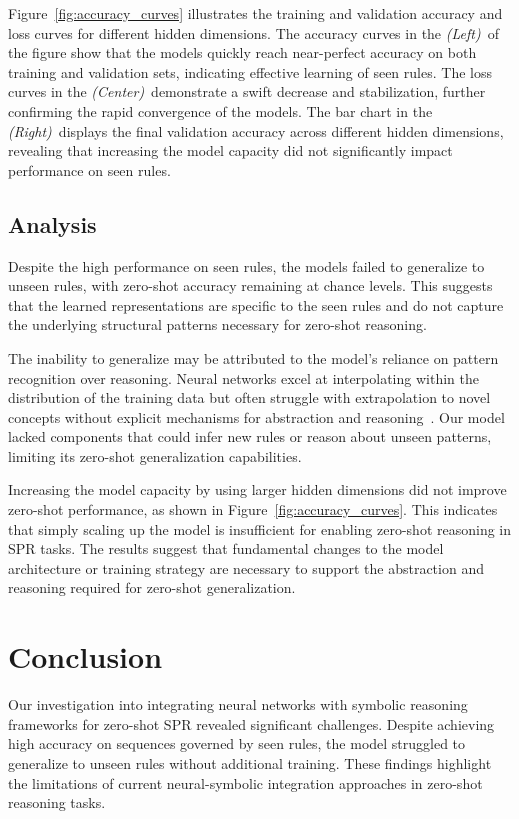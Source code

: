 \documentclass{article} %
\newcommand{\figleft}{{\em (Left)\/}}
\newcommand{\figcenter}{{\em (Center)\/}}
\newcommand{\figright}{{\em (Right)\/}}
\theoremstyle{plain}
\begin{document}
Figure~\ref{fig:accuracy_curves} illustrates the training and validation accuracy and loss curves for different hidden dimensions. The accuracy curves in the \figleft\ of the figure show that the models quickly reach near-perfect accuracy on both training and validation sets, indicating effective learning of seen rules. The loss curves in the \figcenter\ demonstrate a swift decrease and stabilization, further confirming the rapid convergence of the models. The bar chart in the \figright\ displays the final validation accuracy across different hidden dimensions, revealing that increasing the model capacity did not significantly impact performance on seen rules.

\subsection{Analysis}

Despite the high performance on seen rules, the models failed to generalize to unseen rules, with zero-shot accuracy remaining at chance levels. This suggests that the learned representations are specific to the seen rules and do not capture the underlying structural patterns necessary for zero-shot reasoning.

The inability to generalize may be attributed to the model's reliance on pattern recognition over reasoning. Neural networks excel at interpolating within the distribution of the training data but often struggle with extrapolation to novel concepts without explicit mechanisms for abstraction and reasoning~\citep{snell2017prototypicalnf}. Our model lacked components that could infer new rules or reason about unseen patterns, limiting its zero-shot generalization capabilities.

Increasing the model capacity by using larger hidden dimensions did not improve zero-shot performance, as shown in Figure~\ref{fig:accuracy_curves}. This indicates that simply scaling up the model is insufficient for enabling zero-shot reasoning in SPR tasks. The results suggest that fundamental changes to the model architecture or training strategy are necessary to support the abstraction and reasoning required for zero-shot generalization.

\section{Conclusion}
\label{sec:conclusion}

Our investigation into integrating neural networks with symbolic reasoning frameworks for zero-shot SPR revealed significant challenges. Despite achieving high accuracy on sequences governed by seen rules, the model struggled to generalize to unseen rules without additional training. These findings highlight the limitations of current neural-symbolic integration approaches in zero-shot reasoning tasks.
\end{document}
